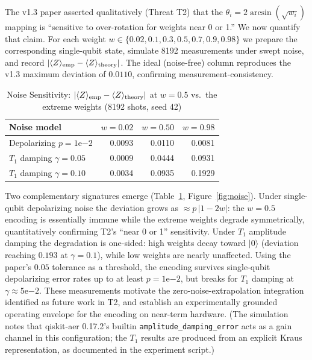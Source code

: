 ﻿\documentclass[12pt,a4paper]{article}
\begin{document}
The v1.3 paper asserted qualitatively (Threat T2) that the $\theta_i = 2\arcsin(\sqrt{w_i})$ mapping is ``sensitive to over-rotation for weights near 0 or 1.'' We now quantify that claim. For each weight $w \in \{0.02, 0.1, 0.3, 0.5, 0.7, 0.9, 0.98\}$ we prepare the corresponding single-qubit state, simulate 8192 measurements under swept noise, and record $|\langle Z\rangle_{\rm emp} - \langle Z\rangle_{\rm theory}|$. The ideal (noise-free) column reproduces the v1.3 maximum deviation of $0.0110$, confirming measurement-consistency.

\begin{table}[H]
\centering
\caption{Noise Sensitivity: $|\langle Z\rangle_{\rm emp} - \langle Z\rangle_{\rm theory}|$ at $w = 0.5$ vs.\ the extreme weights (8192 shots, seed 42)}
\label{tab:noise}
\small
\begin{tabular}{@{}lrrr@{}}
\hline
\textbf{Noise model} & \textbf{$w=0.02$} & \textbf{$w=0.50$} & \textbf{$w=0.98$} \\
\hline
Depolarizing $p = 1\mathrm{e}{-2}$ & 0.0093 & 0.0110 & 0.0081 \\
$T_1$ damping $\gamma = 0.05$       & 0.0009 & 0.0444 & 0.0931 \\
$T_1$ damping $\gamma = 0.10$       & 0.0034 & 0.0935 & 0.1929 \\
\hline
\end{tabular}
\end{table}

Two complementary signatures emerge (Table~\ref{tab:noise}, Figure~\ref{fig:noise}). Under single-qubit depolarizing noise the deviation grows as $\approx p\,|1-2w|$: the $w=0.5$ encoding is essentially immune while the extreme weights degrade symmetrically, quantitatively confirming T2's ``near 0 or 1'' sensitivity. Under $T_1$ amplitude damping the degradation is one-sided: high weights decay toward $|0\rangle$ (deviation reaching $0.193$ at $\gamma=0.1$), while low weights are nearly unaffected. Using the paper's $0.05$ tolerance as a threshold, the encoding survives single-qubit depolarizing error rates up to at least $p = 1\mathrm{e}{-2}$, but breaks for $T_1$ damping at $\gamma \approx 5\mathrm{e}{-2}$. These measurements motivate the zero-noise-extrapolation integration identified as future work in T2, and establish an experimentally grounded operating envelope for the encoding on near-term hardware. (The simulation notes that qiskit-aer 0.17.2's builtin \texttt{amplitude\_damping\_error} acts as a gain channel in this configuration; the $T_1$ results are produced from an explicit Kraus representation, as documented in the experiment script.)
\end{document}
